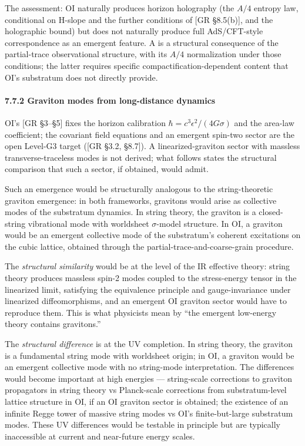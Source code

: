 \documentclass[
]{article}
\begin{document}
The assessment: OI naturally produces horizon holography (the \(A/4\)
entropy law, conditional on H-slope and the further conditions of {[}GR
§8.5(b){]}, and the holographic bound) but does not naturally produce
full AdS/CFT-style correspondence as an emergent feature. A is a
structural consequence of the partial-trace observational structure,
with its \(A/4\) normalization under those conditions; the latter
requires specific compactification-dependent content that OI's
substratum does not directly provide.

\hypertarget{graviton-modes-from-long-distance-dynamics}{%
\paragraph{7.7.2 Graviton modes from long-distance
dynamics}\label{graviton-modes-from-long-distance-dynamics}}

OI's {[}GR §3--§5{]} fixes the horizon calibration
\(\hbar = c^3\epsilon^2/(4G\sigma)\) and the area-law coefficient; the
covariant field equations and an emergent spin-two sector are the open
Level-G3 target ({[}GR §3.2, §8.7{]}). A linearized-graviton sector with
massless transverse-traceless modes is not derived; what follows states
the structural comparison that such a sector, if obtained, would admit.

Such an emergence would be structurally analogous to the
string-theoretic graviton emergence: in both frameworks, gravitons would
arise as collective modes of the substratum dynamics. In string theory,
the graviton is a closed-string vibrational mode with worldsheet
\(\sigma\)-model structure. In OI, a graviton would be an emergent
collective mode of the substratum's coherent excitations on the cubic
lattice, obtained through the partial-trace-and-coarse-grain procedure.

The \emph{structural similarity} would be at the level of the IR
effective theory: string theory produces massless spin-2 modes coupled
to the stress-energy tensor in the linearized limit, satisfying the
equivalence principle and gauge-invariance under linearized
diffeomorphisms, and an emergent OI graviton sector would have to
reproduce them. This is what physicists mean by ``the emergent
low-energy theory contains gravitons.''

The \emph{structural difference} is at the UV completion. In string
theory, the graviton is a fundamental string mode with worldsheet
origin; in OI, a graviton would be an emergent collective mode with no
string-mode interpretation. The differences would become important at
high energies --- string-scale corrections to graviton propagators in
string theory vs Planck-scale corrections from substratum-level lattice
structure in OI, if an OI graviton sector is obtained; the existence of
an infinite Regge tower of massive string modes vs OI's finite-but-large
substratum modes. These UV differences would be testable in principle
but are typically inaccessible at current and near-future energy scales.
\end{document}
